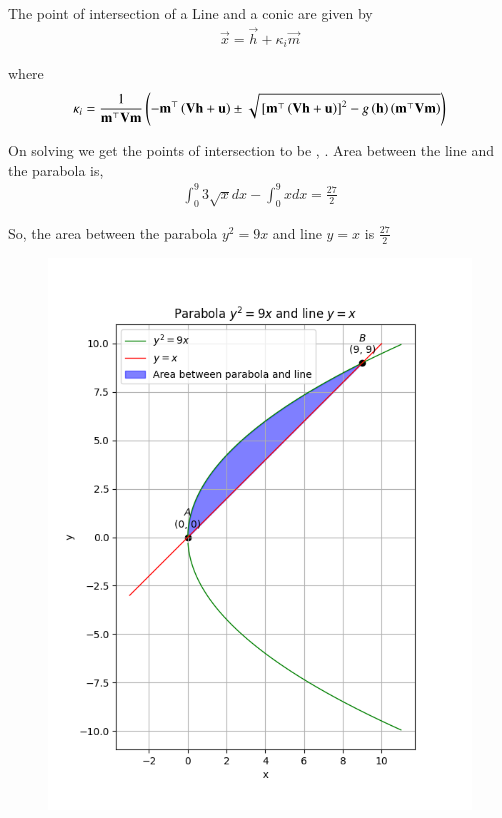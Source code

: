 \documentclass[journal]{IEEEtran}
\begin{document}
	The point of intersection of a Line and a conic are given by 
	\begin{align}
		\vec{x} = \vec{h} + \kappa_i \vec{m}
	\end{align}
	
	where
	\begin{align}
		\kappa_{i} = \frac{1}{\mathbf{m}^{\top} \mathbf{V} \mathbf{m}} \left(-\mathbf{m}^\top \left(\mathbf{V} \mathbf{h} + \mathbf{u}\right) \pm \sqrt{{}\left[\mathbf{m}^\top \left(\mathbf{V} \mathbf{h} + \mathbf{u}\right)\right]^2 - g\left(\mathbf{h}\right) \left(\mathbf{m}^\top \mathbf{V} \mathbf{m}\right)}\right)
	\end{align}

	On solving we get the points of intersection to be  , . Area between the line and the parabola is,
	\begin{align}
		\int_0^9 3\sqrt{x}dx - \int_0^9 x dx = \frac{27}{2}
	\end{align}

	So, the area between the parabola $y^2 = 9x$ and line $y=x$ is $\frac{27}{2}$

	\begin{figure}[h!]
   		\centering
   		\includegraphics[width = 1\linewidth]{plots/plot.png}
   		\caption{}
   		\label{stemplot}
	\end{figure}
\end{document}
